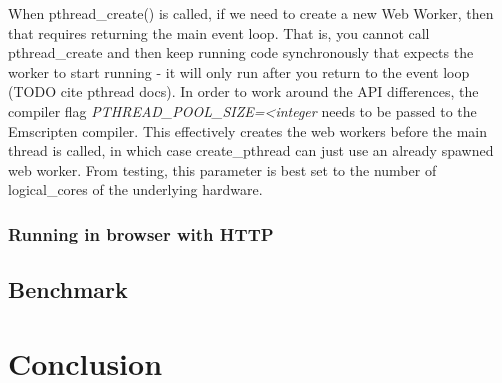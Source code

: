 \documentclass[11pt]{book}
\begin{document}
When pthread\_create() is called, if we need to create a new Web Worker, then that requires returning the main event loop. That is, you cannot call pthread\_create and then keep running code synchronously that expects the worker to start running - it will only run after you return to the event loop (TODO cite pthread docs). In order to work around the API differences, the compiler flag \textit{PTHREAD\_POOL\_SIZE=<integer} needs to be passed to the Emscripten compiler. This effectively creates the web workers before the main thread is called, in which case create\_pthread can just use an already spawned web worker. From testing, this parameter is best set to the number of logical\_cores of the underlying hardware.



\subsection{Running in browser with HTTP}



\section{Benchmark}






\chapter{Conclusion}
\end{document}
